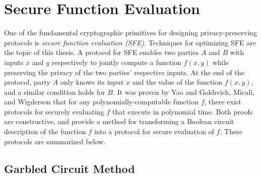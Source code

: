 \section{Secure Function Evaluation}

One of the fundamental cryptographic primitives for designing privacy-preserving
protocols is \textit{secure function evaluation (SFE)}. Techniques
for optimizing SFE are the topic of this thesis. A protocol for SFE
enables two parties $A$ and $B$ with inputs $x$ and $y$ respectively
to jointly compute a function $f(x,y)$ while preserving the privacy
of the two parties' respective inputs. At the end of the protocol,
party $A$ only knows its input $x$ and the value of the function
$f(x,y)$, and a similar condition holds for $B$. It was proven by
Yao \cite{Yao86} and Goldreich, Micali, and Wigderson \cite{GMW87}
that for any polynomially-computable function $f$, there exist protocols
for securely evaluating $f$ that execute in polynomial time. Both
proofs are constructive, and provide a method for transforming a Boolean
circuit description of the function $f$ into a protocol for secure
evaluation of $f$. These protocols are summarized below.


\subsection{Garbled Circuit Method \label{sub:Garbled-Circuit-Method}}

